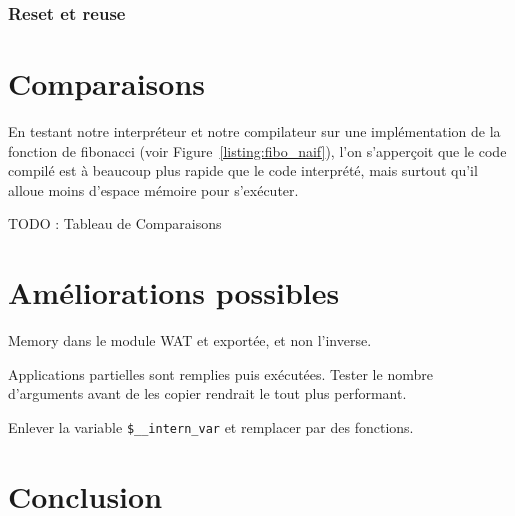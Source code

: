 \documentclass{rapportECL}
\begin{document}
\subsubsection{Reset et reuse}



\section{Comparaisons}

En testant notre interpréteur et notre compilateur sur une implémentation de la fonction de fibonacci 
(voir Figure~\ref{listing:fibo_naif}), l'on s'apperçoit que le code compilé est à beaucoup plus rapide que le code interprété,
mais surtout qu'il alloue moins d'espace mémoire pour s'exécuter.

TODO : Tableau de Comparaisons

\section{Améliorations possibles}

Memory dans le module WAT et exportée, et non l'inverse.

Applications partielles sont remplies puis exécutées. 
Tester le nombre d'arguments avant de les copier rendrait le tout plus performant.

Enlever la variable \verb|$__intern_var| et remplacer par des fonctions.

\section{Conclusion}

\printbibliography
\end{document}
